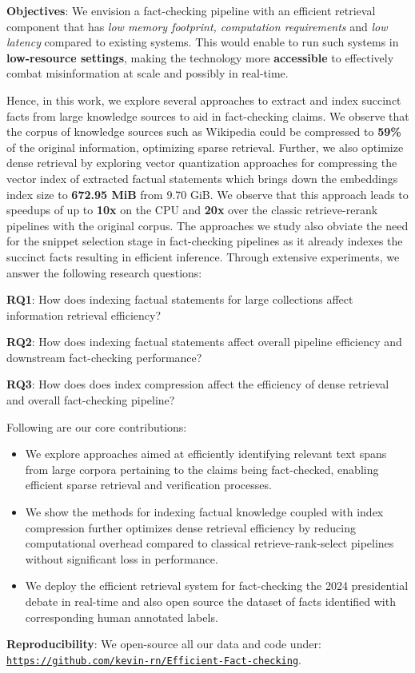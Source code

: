 \noindent \textbf{Objectives}: We envision a fact-checking pipeline with an efficient retrieval component that has \textit{low memory footprint, computation requirements} and \textit{low latency} compared to existing systems. This would enable to run such systems in \textbf{low-resource settings}, making the technology more \textbf{accessible} to effectively combat misinformation at scale and possibly in real-time. 

Hence, in this work, we explore several approaches to extract and index succinct facts from large knowledge sources to aid in fact-checking claims. We observe that the corpus of knowledge sources such as Wikipedia could be compressed to \textbf{59\%} of the original information, optimizing sparse retrieval. Further, we also optimize dense retrieval by exploring vector quantization approaches for compressing the vector index of extracted factual statements which brings down the embeddings index size to \textbf{672.95 MiB} from 9.70 GiB. We observe that this approach leads to speedups of up to \textbf{10x} on the CPU and \textbf{20x} over the classic retrieve-rerank pipelines with the original corpus. The approaches we study also obviate the need for the snippet selection stage in fact-checking pipelines as it already indexes the succinct facts resulting in efficient inference.
 Through extensive experiments, we answer the following research questions:

\noindent \textbf{RQ1}: How does indexing factual statements for large collections affect information retrieval efficiency?

\noindent \textbf{RQ2}: How does indexing factual statements affect overall pipeline efficiency and downstream fact-checking performance?

\noindent \textbf{RQ3}: How does does index compression affect the efficiency of dense retrieval and overall fact-checking pipeline?

\noindent Following are our core contributions: 
\begin{itemize}
    \item We explore approaches aimed at efficiently identifying relevant text spans from large corpora pertaining to the claims being fact-checked, enabling efficient sparse retrieval and verification processes.
    
    \item We show the methods for indexing factual knowledge
    coupled with index compression further optimizes dense retrieval efficiency by reducing computational overhead compared to classical retrieve-rank-select pipelines without significant loss in performance.
    
    \item We deploy the efficient retrieval system for fact-checking the 2024 presidential debate in real-time and also open source the dataset of facts identified with corresponding human annotated labels. 
      

\end{itemize}
\textbf{Reproducibility}: We open-source all our data and code under:
\texttt{\url{https://github.com/kevin-rn/Efficient-Fact-checking}}.
